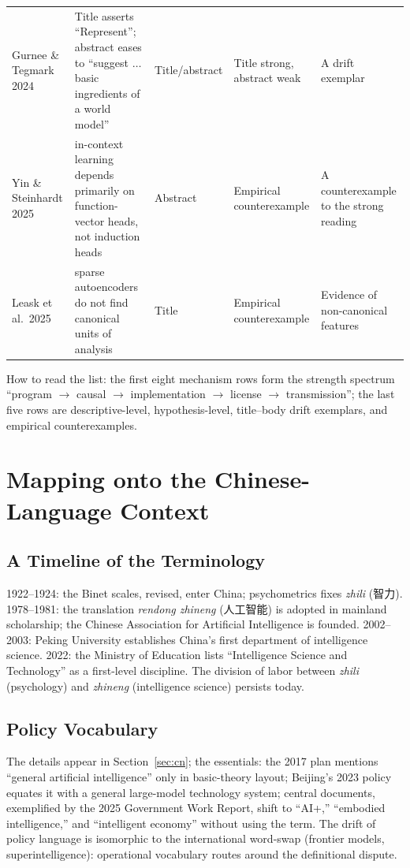 \documentclass[10pt]{article}
\begin{document}
\begin{longtable}{p{3.2cm} p{4.8cm} p{1.7cm} p{1.5cm} p{3.0cm}}
Gurnee \& Tegmark 2024\cite{gurnee2024space} & Title asserts ``Represent''; abstract eases to ``suggest $\ldots$ basic ingredients of a world model'' & Title/abstract & Title strong, abstract weak & A drift exemplar \\
Yin \& Steinhardt 2025\cite{yin2025which} & in-context learning depends primarily on function-vector heads, not induction heads & Abstract & Empirical counterexample & A counterexample to the strong reading \\
Leask et al.\ 2025\cite{leask2025canonical} & sparse autoencoders do not find canonical units of analysis & Title & Empirical counterexample & Evidence of non-canonical features \\
\bottomrule
\end{longtable}

How to read the list: the first eight mechanism rows form the strength spectrum ``program $\to$ causal $\to$ implementation $\to$ license $\to$ transmission''; the last five rows are descriptive-level, hypothesis-level, title--body drift exemplars, and empirical counterexamples.

\section{Mapping onto the Chinese-Language Context}\label{app:cn}

\subsection{A Timeline of the Terminology}

1922--1924: the Binet scales, revised, enter China; psychometrics fixes \emph{zhili} (智力). 1978--1981: the translation \emph{rendong zhineng} (人工智能) is adopted in mainland scholarship; the Chinese Association for Artificial Intelligence is founded. 2002--2003: Peking University establishes China's first department of intelligence science. 2022: the Ministry of Education lists ``Intelligence Science and Technology'' as a first-level discipline. The division of labor between \emph{zhili} (psychology) and \emph{zhineng} (intelligence science) persists today.

\subsection{Policy Vocabulary}

The details appear in Section~\ref{sec:cn}; the essentials: the 2017 plan mentions ``general artificial intelligence'' only in basic-theory layout\cite{state2017plan}; Beijing's 2023 policy equates it with a general large-model technology system\cite{beijing2023measures}; central documents, exemplified by the 2025 Government Work Report, shift to ``AI+,'' ``embodied intelligence,'' and ``intelligent economy'' without using the term\cite{gov2025report}. The drift of policy language is isomorphic to the international word-swap (frontier models, superintelligence): operational vocabulary routes around the definitional dispute.
\end{document}
